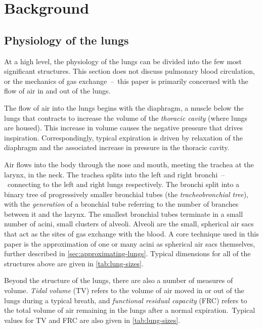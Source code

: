 %
\section{Background}

\subsection{Physiology of the lungs}

At a high level, the physiology of the lungs can be divided into the few most significant
structures. This section does not discuss pulmonary blood circulation, or the mechanics of gas
exchange~--~this paper is primarily concerned with the flow of air in and out of the lungs.

The flow of air into the lungs begins with the diaphragm, a muscle below the lungs that contracts to
increase the volume of the \textit{thoracic cavity} (where lungs are housed). This increase in
volume causes the negative pressure that drives inspiration. Correspondingly, typical expiration is
driven by relaxation of the diaphragm and the associated increase in pressure in the thoracic
cavity.

Air flows into the body through the nose and mouth, meeting the trachea at the larynx, in the neck.
The trachea splits into the left and right bronchi~--~connecting to the left and right lungs
respectively. The bronchi split into a binary tree of progressively smaller bronchial tubes (the
\textit{tracheobronchial tree}), with the \textit{generation} of a bronchial tube referring to the
number of branches between it and the larynx. The smallest bronchial tubes terminate in a small
number of acini, small clusters of alveoli. Alveoli are the small, spherical air sacs that act as
the sites of gas exchange with the blood. A core technique used in this paper is the approximation
of one or many acini as spherical air sacs themselves, further described in
\autoref{sec:approximating-lungs}. Typical dimensions for all of the structures above are given in
\autoref{tab:lung-sizes}.


Beyond the structure of the lungs, there are also a number of measures of volume. \textit{Tidal
volume} (TV) refers to the volume of air moved in or out of the lungs during a typical breath, and
\textit{functional residual capacity} (FRC) refers to the total volume of air remaining in the lungs
after a normal expiration.\footnotemark\ Typical values for TV and FRC are also given in
\autoref{tab:lung-sizes}.

